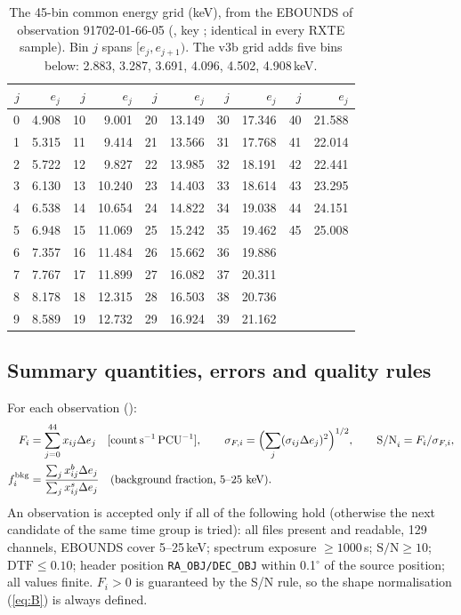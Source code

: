 \begin{table}[htbp]
\centering\scriptsize
\caption[The common energy grid]{The 45-bin common energy grid (keV), from the EBOUNDS of observation 91702-01-66-05
(, key ; identical in every RXTE sample). Bin $j$ spans $[e_j,e_{j+1})$.
The v3b grid adds five bins below: 2.883, 3.287, 3.691, 4.096, 4.502, 4.908\,keV.}
\label{tab:grid}
\setlength{\tabcolsep}{3pt}
\begin{tabular}{@{}rr@{\hspace{10pt}}rr@{\hspace{10pt}}rr@{\hspace{10pt}}rr@{\hspace{10pt}}rr@{}}
\toprule
$j$ & $e_j$ & $j$ & $e_j$ & $j$ & $e_j$ & $j$ & $e_j$ & $j$ & $e_j$\\
\midrule
0 & 4.908 & 10 & 9.001 & 20 & 13.149 & 30 & 17.346 & 40 & 21.588 \\
1 & 5.315 & 11 & 9.414 & 21 & 13.566 & 31 & 17.768 & 41 & 22.014 \\
2 & 5.722 & 12 & 9.827 & 22 & 13.985 & 32 & 18.191 & 42 & 22.441 \\
3 & 6.130 & 13 & 10.240 & 23 & 14.403 & 33 & 18.614 & 43 & 23.295 \\
4 & 6.538 & 14 & 10.654 & 24 & 14.822 & 34 & 19.038 & 44 & 24.151 \\
5 & 6.948 & 15 & 11.069 & 25 & 15.242 & 35 & 19.462 & 45 & 25.008 \\
6 & 7.357 & 16 & 11.484 & 26 & 15.662 & 36 & 19.886 & & \\
7 & 7.767 & 17 & 11.899 & 27 & 16.082 & 37 & 20.311 & & \\
8 & 8.178 & 18 & 12.315 & 28 & 16.503 & 38 & 20.736 & & \\
9 & 8.589 & 19 & 12.732 & 29 & 16.924 & 39 & 21.162 & & \\
\bottomrule
\end{tabular}
\end{table}

\subsection{Summary quantities, errors and quality rules}\label{sec:quality}
For each observation ():
\begin{align}
F_i &= \sum_{j=0}^{44} x_{ij}\Delta e_j \quad[\mathrm{count\,s^{-1}\,PCU^{-1}}],\qquad
\sigma_{F,i} = \Bigl(\sum_j (\sigma_{ij}\Delta e_j)^2\Bigr)^{1/2},\qquad \mathrm{S/N}_i = F_i/\sigma_{F,i}, \label{eq:F}\\
f^{\mathrm{bkg}}_i &= \frac{\sum_j x^{b}_{ij}\Delta e_j}{\sum_j x^{s}_{ij}\Delta e_j}\quad\text{(background fraction, 5--25 keV)}.\nonumber
\end{align}
An observation is accepted only if all of the following hold (otherwise the next candidate of the same time group is
tried): all files present and readable, 129 channels, EBOUNDS cover 5--25\,keV; spectrum exposure $\ge 1000$\,s;
$\mathrm{S/N}\ge 10$; $\mathrm{DTF}\le 0.10$; header position \texttt{RA\_OBJ/DEC\_OBJ} within 0.1$^\circ$ of the
source position; all values finite. $F_i>0$ is guaranteed by the S/N rule, so the shape normalisation
(\cref{eq:B}) is always defined.

